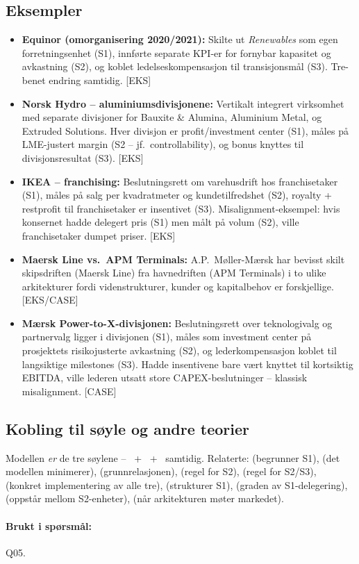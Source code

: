 \subsection*{Eksempler}
\begin{itemize}
\item \textbf{Equinor (omorganisering 2020/2021):} Skilte ut \emph{Renewables} som egen forretningsenhet (S1), innførte separate KPI-er for fornybar kapasitet og avkastning (S2), og koblet ledelseskompensasjon til transisjonsmål (S3). Tre-benet endring samtidig. [EKS]
\item \textbf{Norsk Hydro -- aluminiumsdivisjonene:} Vertikalt integrert virksomhet med separate divisjoner for Bauxite \& Alumina, Aluminium Metal, og Extruded Solutions. Hver divisjon er profit/investment center (S1), måles på LME-justert margin (S2 -- jf.\ controllability), og bonus knyttes til divisjonsresultat (S3). [EKS]
\item \textbf{IKEA -- franchising:} Beslutningsrett om varehusdrift hos franchisetaker (S1), måles på salg per kvadratmeter og kundetilfredshet (S2), royalty + restprofit til franchisetaker er insentivet (S3). Misalignment-eksempel: hvis konsernet hadde delegert pris (S1) men målt på volum (S2), ville franchisetaker dumpet priser. [EKS]
\item \textbf{Maersk Line vs.\ APM Terminals:} A.P.\ Møller-Mærsk har bevisst skilt skipsdriften (Maersk Line) fra havnedriften (APM Terminals) i to ulike arkitekturer fordi videnstrukturer, kunder og kapitalbehov er forskjellige. [EKS/CASE]
\item \textbf{Mærsk Power-to-X-divisjonen:} Beslutningsrett over teknologivalg og partnervalg ligger i divisjonen (S1), måles som investment center på prosjektets risikojusterte avkastning (S2), og lederkompensasjon koblet til langsiktige milestones (S3). Hadde insentivene bare vært knyttet til kortsiktig EBITDA, ville lederen utsatt store CAPEX-beslutninger -- klassisk misalignment. [CASE]
\end{itemize}

\subsection*{Kobling til søyle og andre teorier}
Modellen \emph{er} de tre søylene -- \SOne\ + \STwo\ + \SThree\ samtidig. Relaterte:  (begrunner S1),  (det modellen minimerer),  (grunnrelasjonen),  (regel for S2),  (regel for S2/S3),  (konkret implementering av alle tre),  (strukturer S1),  (graden av S1-delegering),  (oppstår mellom S2-enheter),  (når arkitekturen møter markedet).

\paragraph{Brukt i spørsmål:} Q05.
